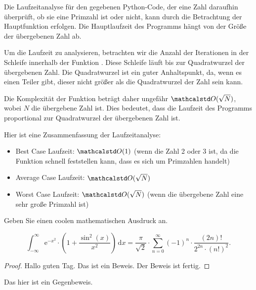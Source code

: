 \documentclass[10pt]{article}
\begin{document}
\begin{task}[Primzahlüberprüfung]
\begin{subtask}
            \begin{solution}
                Die Laufzeitanalyse für den gegebenen Python-Code, der eine Zahl daraufhin überprüft, ob sie eine Primzahl ist oder nicht, kann durch die Betrachtung der Hauptfunktion  erfolgen.
                Die Hauptlaufzeit des Programms hängt von der Größe der übergebenen Zahl ab.

                Um die Laufzeit zu analysieren, betrachten wir die Anzahl der Iterationen in der Schleife innerhalb der Funktion .
                Diese Schleife läuft bis zur Quadratwurzel der übergebenen Zahl.
                Die Quadratwurzel ist ein guter Anhaltspunkt, da, wenn es einen Teiler gibt, dieser nicht größer als die Quadratwurzel der Zahl sein kann.

                Die Komplexität der Funktion  beträgt daher ungefähr $\O(\sqrt{N})$, wobei $N$ die übergebene Zahl ist.
                Dies bedeutet, dass die Laufzeit des Programms proportional zur Quadratwurzel der übergebenen Zahl ist.

                Hier ist eine Zusammenfassung der Laufzeitanalyse:

                \begin{itemize}
                    \item Best Case Laufzeit: $\O(1)$ (wenn die Zahl 2 oder 3 ist, da die Funktion schnell feststellen kann, dass es sich um Primzahlen handelt)
                    \item Average Case Laufzeit: $\O(\sqrt{N})$
                    \item Worst Case Laufzeit: $\O(\sqrt{N})$ (wenn die übergebene Zahl eine sehr große Primzahl ist)
                \end{itemize}
            \end{solution}
        \end{subtask}
    \end{task}

    \begin{task}[Mathematik]
        Geben Sie einen coolen mathematischen Ausdruck an.

        \begin{solution}
            \[
                \int_{-\infty}^{\infty} \mathrm{e}^{-x^2} \cdot \left(1 + \frac{\sin^2(x)}{x^2}\right) \, \mathrm{d}x = \frac{\pi}{\sqrt{2}} \cdot \sum_{n=0}^{\infty} (-1)^n \cdot \frac{(2n)!}{2^{2n} \cdot (n!)^2}.
            \]

            \begin{proof}
                Hallo guten Tag. Das ist ein Beweis. Der Beweis ist fertig.
            \end{proof}

            \begin{counterproof}
                Das hier ist ein Gegenbeweis.
            \end{counterproof}
        \end{solution}
    \end{task}
\end{document}
